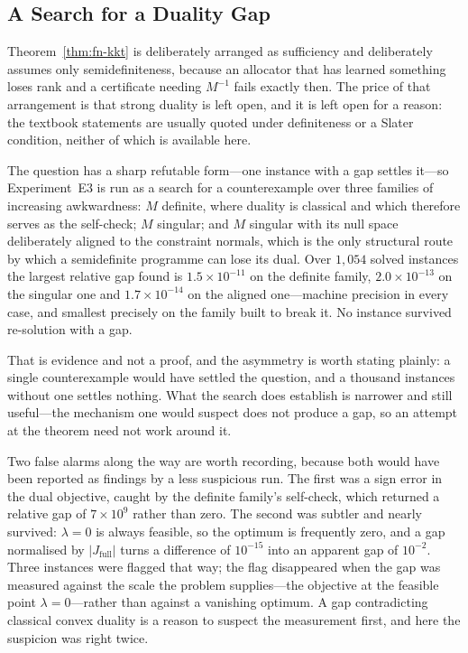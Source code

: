 \subsection{A Search for a Duality Gap}
\label{sec:fn-e3results}

Theorem~\ref{thm:fn-kkt} is deliberately arranged as sufficiency and deliberately assumes only
semidefiniteness, because an allocator that has learned something loses rank and a certificate
needing $M^{-1}$ fails exactly then. The price of that arrangement is that strong duality is
left open, and it is left open for a reason: the textbook statements are usually quoted under
definiteness or a Slater condition, neither of which is available here.

The question has a sharp refutable form---one instance with a gap settles it---so
Experiment~E3 is run as a search for a counterexample over three families of increasing
awkwardness: $M$ definite, where duality is classical and which therefore serves as the
self-check; $M$ singular; and $M$ singular with its null space deliberately aligned to the
constraint normals, which is the only structural route by which a semidefinite programme can
lose its dual. Over $1{,}054$ solved instances the largest relative gap found is
$1.5\times10^{-11}$ on the definite family, $2.0\times10^{-13}$ on the singular one and
$1.7\times10^{-14}$ on the aligned one---machine precision in every case, and smallest
precisely on the family built to break it. No instance survived re-solution with a gap.
\NUM{}

That is evidence and not a proof, and the asymmetry is worth stating plainly: a single
counterexample would have settled the question, and a thousand instances without one settles
nothing. What the search does establish is narrower and still useful---the mechanism one would
suspect does not produce a gap, so an attempt at the theorem need not work around it.

Two false alarms along the way are worth recording, because both would have been reported as
findings by a less suspicious run. The first was a sign error in the dual objective, caught by
the definite family's self-check, which returned a relative gap of $7\times10^{9}$ rather than
zero. The second was subtler and nearly survived: $\lambda=0$ is always feasible, so the
optimum is frequently zero, and a gap normalised by $|J_{\mathrm{full}}|$ turns a difference of
$10^{-15}$ into an apparent gap of $10^{-2}$. Three instances were flagged that way; the flag
disappeared when the gap was measured against the scale the problem supplies---the objective at
the feasible point $\lambda=0$---rather than against a vanishing optimum. A gap contradicting
classical convex duality is a reason to suspect the measurement first, and here the suspicion
was right twice.

